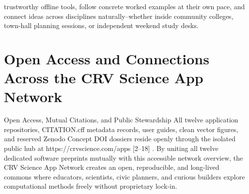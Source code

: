 \documentclass[10pt,letterpaper]{article}
\begin{document}
trustworthy offline tools, follow concrete worked examples at their own pace, and connect ideas across disciplines naturally--whether inside community colleges, town-hall planning sessions, or independent weekend study desks.

\section{Open Access and Connections Across the CRV Science App Network}
Open Access, Mutual Citations, and Public Stewardship All twelve application repositories, CITATION.cff metadata records, user guides, clean vector figures, and reserved Zenodo Concept DOI dossiers reside openly through the isolated public hub at https://crvscience.com/apps [2--18] . By uniting all twelve dedicated software preprints mutually with this accessible network overview, the CRV Science App Network creates an open, reproducible, and long-lived commons where educators, scientists, civic planners, and curious builders explore computational methods freely without proprietary lock-in.


\end{document}
